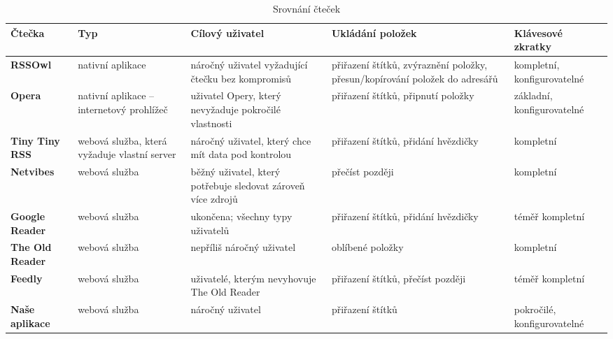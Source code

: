 \begin{sidewaystable}
	\caption{Srovnání čteček}\label{tab:srovnani-ctecek}
	\tabulinesep=8pt 
	\begin{tabu} {| X[-1.5,l,p] || X[-1.5,l,p] | X[-2,l,p] | X[-2,l,p] | X[-1.2,l,p] |}
		\rowfont{\bfseries}
		\hline
		Čtečka & 
		Typ & 
		Cílový uživatel & 
		Ukládání položek &
		Klávesové zkratky \\ 
		\hline
		\hline
		\textbf{RSSOwl} & 
		nativní aplikace & 
		náročný uživatel vyžadující čtečku bez kompromisů & 
		přiřazení štítků, zvýraznění položky, přesun/kopírování položek do adresářů &
		kompletní, konfigurovatelné \\
		\hline
		\textbf{Opera} & 
		nativní aplikace -- internetový prohlížeč & 
		uživatel Opery, který nevyžaduje pokročilé vlastnosti & 
		přiřazení štítků, připnutí položky & 
		základní, konfigurovatelné \\
		\hline
		\textbf{Tiny Tiny RSS} & 
		webová služba, která vyžaduje vlastní server & 
		náročný uživatel, který chce mít data pod kontrolou & 
		přiřazení štítků, přidání hvězdičky &
		kompletní \\
		\hline
		\textbf{Netvibes} &
		webová služba &
		běžný uživatel, který potřebuje sledovat zároveň více zdrojů &
		přečíst později &
		kompletní \\
		\hline
		\textbf{Google Reader} &
		webová služba & 
		ukončena; všechny typy uživatelů & 
		přiřazení štítků, přidání hvězdičky &
		téměř kompletní \\
		\hline
		\textbf{The Old Reader} & 
		webová služba & 
		nepříliš náročný uživatel & 
		oblíbené položky &
		kompletní \\
		\hline
		\textbf{Feedly} & 
		webová služba & 
		uživatelé, kterým nevyhovuje The Old Reader & 
		přiřazení štítků, přečíst později &
		téměř kompletní \\
		\hline
		\hline
		\textbf{Naše aplikace} &
		webová služba &
		náročný uživatel &
		přiřazení štítků &
		pokročilé, konfigurovatelné \\
		\hline
	\end{tabu}
\end{sidewaystable}
